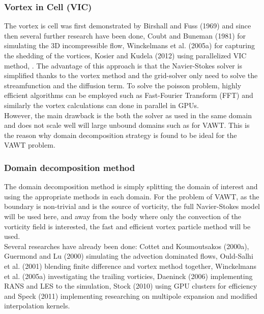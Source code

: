 \subsubsection*{Vortex in Cell (VIC)}
The vortex is cell was first demonstrated by Birshall and Fuss (1969) \cite{Birdsall1969} and since then several further research have been done, Coubt and Buneman (1981) \cite{Couet1981} for simulating the 3D incompressible flow, Winckelmans et al. (2005a) \cite{Winckelmans2005a} for capturing the shedding of the vortices, Kosier and Kudela (2012) \cite{Kosior2012} using parallelized VIC method, \cite{Kosior2012}. The advantage of this approach is that the Navier-Stokes solver is simplified thanks to the vortex method and the grid-solver only need to solve the streamfunction and the diffusion term. To solve the poisson problem, highly efficient algorithms can be employed such as Fast-Fourier Transform (FFT) and similarly the vortex calculations can done in parallel in GPUs.\\

However, the main drawback is the both the solver as used in the same domain and does not scale well will large unbound domains such as for VAWT. This is the reason why domain decomposition strategy is found to be ideal for the VAWT problem.\\

\subsubsection*{Domain decomposition method}
The domain decomposition method is simply splitting the domain of interest and using the appropriate methods in each domain. For the problem of VAWT, as the boundary is non-trivial and is the source of vorticity, the full Navier-Stokes model will be used here, and away from the body where only the convection of the vorticity field is interested, the fast and efficient vortex particle method will be used.\\

Several researches have already been done: Cottet and Koumoutsakos (2000a)\cite{Cottet2000a}, Guermond and Lu (2000) \cite{Guermond2000} simulating the advection dominated flows, Ould-Salhi et al. (2001) \cite{Ould-Salihi2001} blending finite difference and vortex method together, Winckelmans et al. (2005a) \cite{Winckelmans2005a} investigating the trailing vorticies, Daeninck (2006) \cite{Daeninck2006} implementing RANS and LES to the simulation, Stock (2010) \cite{Stock} using GPU clusters for efficiency and Speck (2011) \cite{Speck2011a} implementing researching on multipole expansion and modified interpolation kernels.\\

